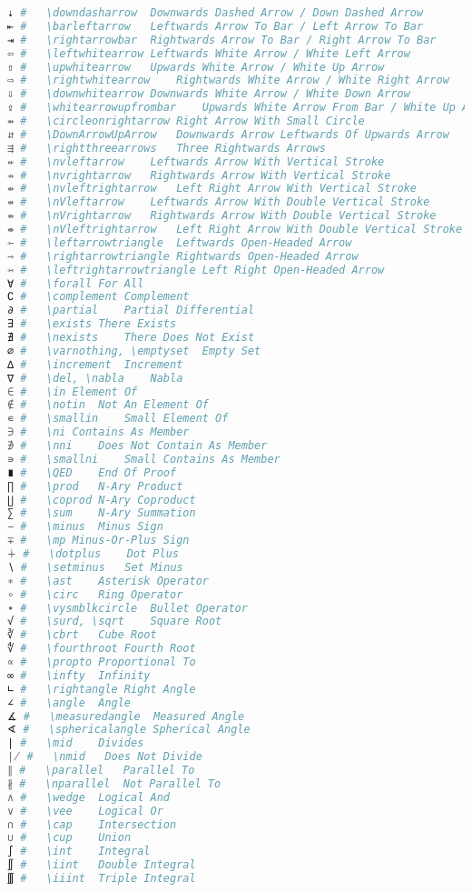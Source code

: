 \begin{lstlisting}[language=Julia, style=julia, linewidth=\textwidth]
⇣ #   \downdasharrow  Downwards Dashed Arrow / Down Dashed Arrow
⇤ #   \barleftarrow   Leftwards Arrow To Bar / Left Arrow To Bar
⇥ #   \rightarrowbar  Rightwards Arrow To Bar / Right Arrow To Bar
⇦ #   \leftwhitearrow Leftwards White Arrow / White Left Arrow
⇧ #   \upwhitearrow   Upwards White Arrow / White Up Arrow
⇨ #   \rightwhitearrow    Rightwards White Arrow / White Right Arrow
⇩ #   \downwhitearrow Downwards White Arrow / White Down Arrow
⇪ #   \whitearrowupfrombar    Upwards White Arrow From Bar / White Up Arrow From Bar
⇴ #   \circleonrightarrow Right Arrow With Small Circle
⇵ #   \DownArrowUpArrow   Downwards Arrow Leftwards Of Upwards Arrow
⇶ #   \rightthreearrows   Three Rightwards Arrows
⇷ #   \nvleftarrow    Leftwards Arrow With Vertical Stroke
⇸ #   \nvrightarrow   Rightwards Arrow With Vertical Stroke
⇹ #   \nvleftrightarrow   Left Right Arrow With Vertical Stroke
⇺ #   \nVleftarrow    Leftwards Arrow With Double Vertical Stroke
⇻ #   \nVrightarrow   Rightwards Arrow With Double Vertical Stroke
⇼ #   \nVleftrightarrow   Left Right Arrow With Double Vertical Stroke
⇽ #   \leftarrowtriangle  Leftwards Open-Headed Arrow
⇾ #   \rightarrowtriangle Rightwards Open-Headed Arrow
⇿ #   \leftrightarrowtriangle Left Right Open-Headed Arrow
∀ #   \forall For All
∁ #   \complement Complement
∂ #   \partial    Partial Differential
∃ #   \exists There Exists
∄ #   \nexists    There Does Not Exist
∅ #   \varnothing, \emptyset  Empty Set
∆ #   \increment  Increment
∇ #   \del, \nabla    Nabla
∈ #   \in Element Of
∉ #   \notin  Not An Element Of
∊ #   \smallin    Small Element Of
∋ #   \ni Contains As Member
∌ #   \nni    Does Not Contain As Member
∍ #   \smallni    Small Contains As Member
∎ #   \QED    End Of Proof
∏ #   \prod   N-Ary Product
∐ #   \coprod N-Ary Coproduct
∑ #   \sum    N-Ary Summation
− #   \minus  Minus Sign
∓ #   \mp Minus-Or-Plus Sign
∔ #   \dotplus    Dot Plus
∖ #   \setminus   Set Minus
∗ #   \ast    Asterisk Operator
∘ #   \circ   Ring Operator
∙ #   \vysmblkcircle  Bullet Operator
√ #   \surd, \sqrt    Square Root
∛ #   \cbrt   Cube Root
∜ #   \fourthroot Fourth Root
∝ #   \propto Proportional To
∞ #   \infty  Infinity
∟ #   \rightangle Right Angle
∠ #   \angle  Angle
∡ #   \measuredangle  Measured Angle
∢ #   \sphericalangle Spherical Angle
∣ #   \mid    Divides
∤ #   \nmid   Does Not Divide
∥ #   \parallel   Parallel To
∦ #   \nparallel  Not Parallel To
∧ #   \wedge  Logical And
∨ #   \vee    Logical Or
∩ #   \cap    Intersection
∪ #   \cup    Union
∫ #   \int    Integral
∬ #   \iint   Double Integral
∭ #   \iiint  Triple Integral

\end{lstlisting}
